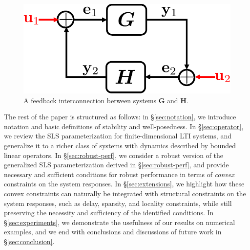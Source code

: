 \begin{figure}
\centering
\includegraphics[width=.45\columnwidth]{well-posed}
\caption{A feedback interconnection between systems $\mathbf{G}$ and $\mathbf{H}$.}
\label{fig:well-posed}
\end{figure}

The rest of the paper is structured as follows: in \S \ref{sec:notation}, we introduce notation and basic definitions of stability and well-posedness.  In \S \ref{sec:operator}, we review the SLS parameterization for finite-dimensional LTI systems, and generalize it to a richer class of systems with dynamics described by bounded linear operators.  In \S \ref{sec:robust-perf}, we consider a robust version of the generalized SLS parameterization derived in \S \ref{sec:robust-perf}, and provide necessary and sufficient conditions for robust performance in terms of \emph{convex} constraints on the system responses.  In \S \ref{sec:extensions}, we highlight how these convex constraints can naturally be integrated with structural constraints on the system responses, such as delay, sparsity, and locality constraints, while still preserving the necessity and sufficiency of the identified conditions.  In \S \ref{sec:experiments}, we demonstrate the usefulness of our results on numerical examples, and we end  with conclusions and discussions of future work in \S \ref{sec:conclusion}.
